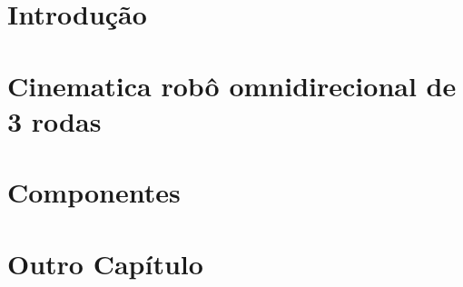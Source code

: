 





\frenchspacing 


	

\textual

	\chapter{Introdução}
	

	

	\chapter{Cinematica robô omnidirecional de 3 rodas}
	

	\chapter{Componentes}
	

	\chapter{Outro Capítulo}
	




	


	

\postextual

	

	

	

	



\printindex


